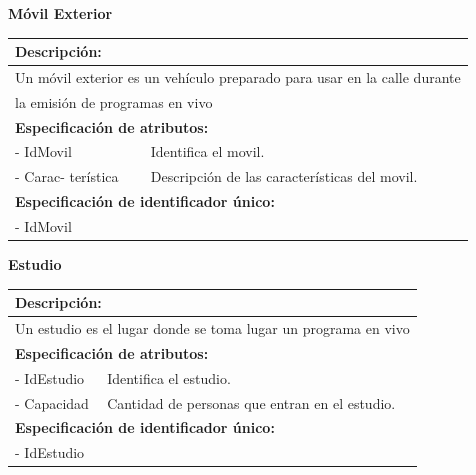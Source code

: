 \documentclass[a4paper,10pt]{article}
\begin{document}
  	
  	\begin{flushleft}
      \begin{large} \bf{M\'ovil Exterior} \end{large}
    \end{flushleft}
      \begin{tabular}{| p{2cm} | p{9cm} |}
	\hline
	\multicolumn{2}{|l|}{\bf{Descripci\'on:}} \\
	\hline
	\multicolumn{2}{|l|}{Un m\'ovil exterior es un veh\'iculo preparado para usar en la calle durante} \\
	\multicolumn{2}{|l|}{la emisi\'on de programas en vivo} \\	
	\hline	
	\multicolumn{2}{|l|}{\bf{Especificaci\'on de atributos:}} \\
	\hline
	- IdMovil & Identifica el movil. \\
	\hline \hline
	- Carac- \newline ter\'istica & Descripci\'on de las caracter\'isticas del movil. \\
	\hline
	\multicolumn{2}{|l|}{\bf{Especificaci\'on de identificador \'unico:}} \\
	\hline
	\multicolumn{2}{|l|}{- IdMovil} \\
	\hline
      \end{tabular}
      
     	\begin{flushleft}
      \begin{large} \bf{Estudio} \end{large}
    \end{flushleft}
      \begin{tabular}{| p{2cm} | p{9cm} |}
	\hline
	\multicolumn{2}{|l|}{\bf{Descripci\'on:}} \\
	\hline
	\multicolumn{2}{|l|}{Un estudio es el lugar donde se toma lugar un programa en vivo} \\
	\hline	
	\multicolumn{2}{|l|}{\bf{Especificaci\'on de atributos:}} \\
	\hline
	- IdEstudio & Identifica el estudio. \\
	\hline \hline
	- Capacidad & Cantidad de personas que entran en el estudio. \\
	\hline
	\multicolumn{2}{|l|}{\bf{Especificaci\'on de identificador \'unico:}} \\
	\hline
	\multicolumn{2}{|l|}{- IdEstudio} \\
	\hline
      \end{tabular} 
      
\end{document}
